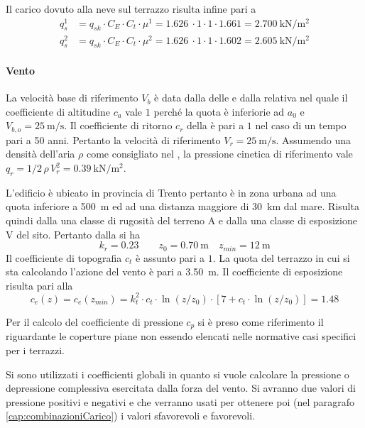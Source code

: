 Il carico dovuto alla neve sul terrazzo risulta infine pari a 
\begin{align}
q_s^1 &= q_{sk} \cdot C_E \cdot C_t \cdot \mu^1 = \SI{1.626}{} \cdot 1 \cdot 1 \cdot 1.661 = \SI{2.700}{\kilo\newton\per\square\meter}\\
q_s^2 &= q_{sk} \cdot C_E \cdot C_t \cdot \mu^2 = \SI{1.626}{} \cdot 1 \cdot 1 \cdot 1.602 = \SI{2.605}{\kilo\newton\per\square\meter}\label{eq:qneve}
\end{align}
\paragraph*{Vento} \label{cap:ventoTerrazzo} 
La velocità base di riferimento $V_b$ è data dalla  delle  e dalla relativa  nel quale il coefficiente di altitudine $c_a$ vale $1$ perché la quota è inferiorie ad $a_0$ e $V_{b,o}=\SI{25}{\meter\per\second}$. 
Il coefficiente di ritorno $c_r$ della  è pari a $1$ nel caso di un tempo pari a 50 anni. 
Pertanto la velocità di riferimento $V_r=\SI{25}{\meter\per\second}$.
Assumendo una densità dell'aria $\rho$ come consigliato nel , la pressione cinetica di riferimento vale $q_r =1/2\, \rho\, V_r^2 = \SI{0.39}{\kilo\newton\per\square\meter}$. 

L'edificio è ubicato in provincia di Trento pertanto è in zona urbana ad una quota inferiore a \SI{500}{\meter} ed ad una distanza maggiore di \SI{30}{\kilo\meter} dal mare. 
Risulta quindi dalla  una classe di rugosità del terreno A e dalla  una classe di esposizione V del sito.
Pertanto dalla  si ha
\[
	k_r=0.23 \qquad z_0=\SI{0.70}{\meter} \quad z_{min}=\SI{12}{\meter}
\]
Il coefficiente di topografia $c_t$ è assunto pari a $1$.
La quota del terrazzo in cui si sta calcolando l'azione del vento è pari a \SI{3.50}{\meter}.
Il coefficiente di esposizione risulta pari alla  
\[
	c_e(z)=c_e(z_{min})=k_t^2\cdot c_t \cdot \ln(z/z_0)\cdot[7+c_t\cdot\ln (z/z_0)] = 1.48
\]

Per il calcolo del coefficiente di pressione $c_p$ si è preso come riferimento il  riguardante le coperture piane non essendo elencati nelle normative casi specifici per i terrazzi.

Si sono utilizzati i coefficienti globali in quanto si vuole calcolare la pressione o depressione complessiva esercitata dalla forza del vento. 
Si avranno due valori di pressione positivi e negativi e che verranno usati per ottenere poi (nel paragrafo \ref{cap:combinazioniCarico}) i valori sfavorevoli e favorevoli.

